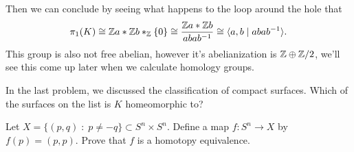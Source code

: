 Then we can conclude by seeing what happens to the loop around the hole that
\[\pi_1(K) \cong \mathbb{Z} a * \mathbb{Z} b *_{\mathbb{Z}} \{0\} \cong \frac{\mathbb{Z} a * \mathbb{Z} b}{abab^{-1}} \cong \langle a, b \mid abab^{-1}\rangle.\]
This group is also not free abelian, however it's abelianization is $\mathbb{Z}\oplus \mathbb{Z} /2$, we'll see this come up later when we calculate homology groups.

\medskip
In the last problem, we discussed the classification of compact surfaces. Which of the surfaces on the list is $K$ homeomorphic to?

\begin{problem}{2.3} Let $X = \{(p,q)\; : \; p\neq -q\}\subset S^n\times S^n$. Define a map $f : S^n \to X$ by $f(p)=(p,p)$. Prove that $f$ is a homotopy equivalence.
\end{problem}

